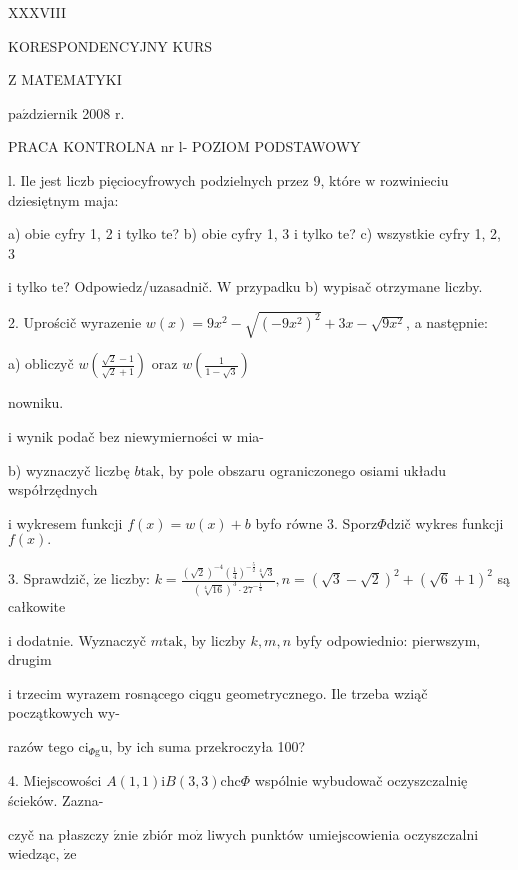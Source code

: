\documentclass[a4paper,12pt]{article}
\begin{document}
XXXVIII

KORESPONDENCYJNY KURS

Z MATEMATYKI

$\mathrm{p}\mathrm{a}\acute{\mathrm{z}}$dziernik 2008 $\mathrm{r}.$

PRACA KONTROLNA nr l- POZIOM PODSTAWOWY

l. Ile jest liczb pięciocyfrowych podzielnych przez 9, które $\mathrm{w}$ rozwinieciu dziesiętnym maja:

a) obie cyfry 1, 2 $\mathrm{i}$ tylko $\mathrm{t}\mathrm{e}$? b) obie cyfry 1, 3 $\mathrm{i}$ tylko $\mathrm{t}\mathrm{e}$? c) wszystkie cyfry 1, 2, 3

$\mathrm{i}$ tylko $\mathrm{t}\mathrm{e}$? Odpowiedz/uzasadnič. $\mathrm{W}$ przypadku b) wypisač otrzymane liczby.

2. Uprościč wyrazenie $w(x)=9x^{2}-\sqrt{(-9x^{2})^{2}}+3x-\sqrt{9x^{2}}$, a następnie:

a) obliczyč $w(\displaystyle \frac{\sqrt{2}-1}{\sqrt{2}+1})$ oraz $w(\displaystyle \frac{1}{1-\sqrt{3}})$

nowniku.

i wynik podač bez niewymierności w mia-

b) wyznaczyč liczbę $b\mathrm{t}\mathrm{a}\mathrm{k}$, by pole obszaru ograniczonego osiami układu współrzędnych

$\mathrm{i}$ wykresem funkcji $f(x)=w(x)+b$ byfo równe 3. Sporz$\Phi$dzič wykres funkcji $f(x).$

3. Sprawdzič, $\dot{\mathrm{z}}\mathrm{e}$ liczby: $k=\displaystyle \frac{(\sqrt{2})^{-4}(\frac{1}{4})^{-\frac{5}{2}}\sqrt[4]{3}}{(\sqrt[4]{16})^{3}\cdot 27^{-\frac{1}{4}}}, n=(\sqrt{3}-\sqrt{2})^{2}+(\sqrt{6}+1)^{2}$ są całkowite

$\mathrm{i}$ dodatnie. Wyznaczyč $m\mathrm{t}\mathrm{a}\mathrm{k}$, by liczby $k, m, n$ byfy odpowiednio: pierwszym, drugim

$\mathrm{i}$ trzecim wyrazem rosnącego ciqgu geometrycznego. Ile trzeba wziąč początkowych wy-

razów tego $\mathrm{c}\mathrm{i}_{\Phi \mathrm{g}}\mathrm{u}$, by ich suma przekroczyła 100?

4. Miejscowości $A(1,1) \mathrm{i}B(3,3) \mathrm{c}\mathrm{h}\mathrm{c}\Phi$ wspólnie wybudowač oczyszczalnię ścieków. Zazna-

czyč na płaszczy $\acute{\mathrm{z}}\mathrm{n}\mathrm{i}\mathrm{e}$ zbiór $\mathrm{m}\mathrm{o}\dot{\mathrm{z}}$ liwych punktów umiejscowienia oczyszczalni wiedząc, $\dot{\mathrm{z}}\mathrm{e}$
\end{document}
